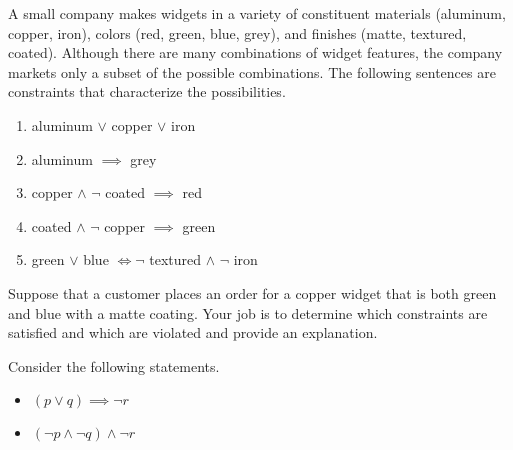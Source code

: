 \documentclass[addpoints]{exam}
\begin{document}
\begin{questions}
\question[5] A small company makes widgets in a variety of constituent materials (aluminum, copper, iron), colors (red, green, blue, grey), and finishes (matte, textured, coated). Although there are many combinations of widget features, the company markets only a subset of the possible combinations. The following sentences are constraints that characterize the possibilities. 
  \begin{enumerate}
  \item aluminum $\lor$ copper $\lor$ iron
  \item aluminum $\implies$ grey
  \item copper $\land$ $\neg$ coated $\implies$ red
  \item coated $\land$ $\neg$ copper $\implies$ green
  \item green $\lor$ blue $\iff \neg$ textured $\land$ $\neg$ iron
  \end{enumerate}
  Suppose that a customer places an order for a copper widget that is both green and blue with a matte coating. Your job is to determine which constraints are satisfied and which are violated and provide an explanation.
  \begin{solution} %
  \end{solution}
  
\question Consider the following statements.
  \begin{itemize}
  \item $ (p \lor q) \implies \neg r$
  \item $(\neg p \land \neg q) \land \neg r$
  \end{itemize}


\end{questions}
\end{document}
